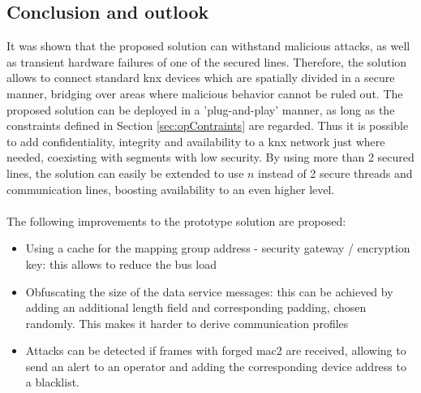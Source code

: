 \subsection{Conclusion and outlook}
It was shown that the proposed solution can withstand malicious attacks, as well as transient hardware failures of one of the secured lines. Therefore, the solution allows to connect
standard \gls{knx} devices which are spatially divided in a secure manner, bridging over areas where malicious behavior cannot be ruled out.
The proposed solution can be deployed in a 'plug-and-play' 
manner, as long as the constraints defined in Section \ref{sec:opContraints} are regarded. Thus it is possible to add confidentiality, integrity and availability to a \gls{knx}
network just where needed, coexisting with segments with low security. By using more than 2 secured lines, the solution can easily be extended to use $n$ instead of 2 secure threads
and communication lines, boosting availability to an even higher level.
\\
\\
The following improvements to the prototype solution are proposed: 
\begin{itemize}
 \item Using a cache for the mapping group address - security gateway / encryption key: this allows to reduce the bus load
 \item Obfuscating the size of the data service messages: this can be achieved by adding an additional length field and corresponding padding, chosen randomly. This makes it harder
 to derive communication profiles
 \item Attacks can be detected if frames with forged \gls{mac2} are received, allowing to send an alert to an operator and adding the corresponding device address to a blacklist. 
 \end{itemize}
